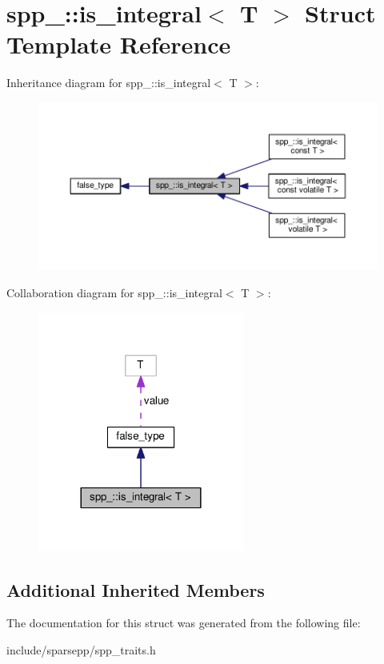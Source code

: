 \hypertarget{structspp___1_1is__integral}{}\section{spp\+\_\+\+:\+:is\+\_\+integral$<$ T $>$ Struct Template Reference}
\label{structspp___1_1is__integral}


Inheritance diagram for spp\+\_\+\+:\+:is\+\_\+integral$<$ T $>$\+:\nopagebreak
\begin{figure}[H]
\begin{center}
\leavevmode
\includegraphics[width=350pt]{structspp___1_1is__integral__inherit__graph}
\end{center}
\end{figure}


Collaboration diagram for spp\+\_\+\+:\+:is\+\_\+integral$<$ T $>$\+:\nopagebreak
\begin{figure}[H]
\begin{center}
\leavevmode
\includegraphics[width=192pt]{structspp___1_1is__integral__coll__graph}
\end{center}
\end{figure}
\subsection*{Additional Inherited Members}


The documentation for this struct was generated from the following file\+:\begin{DoxyCompactItemize}
\item 
include/sparsepp/spp\+\_\+traits.\+h\end{DoxyCompactItemize}

